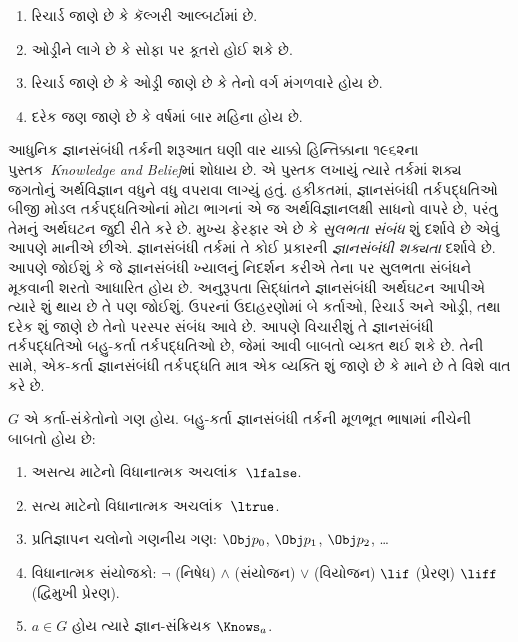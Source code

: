 \begin{enumerate}
\item રિચાર્ડ જાણે છે કે કૅલ્ગરી આલ્બર્ટામાં છે.
\item ઓડ્રીને લાગે છે કે સોફા પર કૂતરો હોઈ શકે છે.
\item રિચાર્ડ જાણે છે કે ઓડ્રી જાણે છે કે તેનો વર્ગ મંગળવારે હોય છે.
\item દરેક જણ જાણે છે કે વર્ષમાં બાર મહિના હોય છે.
\end{enumerate}
આધુનિક જ્ઞાનસંબંધી તર્કની શરૂઆત ઘણી વાર યાક્કો હિન્તિક્કાના
૧૯૬૨ના પુસ્તક~\emph{Knowledge and Belief}માં શોધાય છે. એ પુસ્તક
લખાયું ત્યારે તર્કમાં શક્ય જગતોનું અર્થવિજ્ઞાન વધુને વધુ વપરાવા
લાગ્યું હતું. હકીકતમાં, જ્ઞાનસંબંધી તર્કપદ્ધતિઓ બીજી મોડલ
તર્કપદ્ધતિઓનાં મોટા ભાગનાં એ જ અર્થવિજ્ઞાનલક્ષી સાધનો વાપરે છે,
પરંતુ તેમનું અર્થઘટન જુદી રીતે કરે છે. મુખ્ય ફેરફાર એ છે કે
\emph{સુલભતા સંબંધ} શું દર્શાવે છે એવું આપણે માનીએ છીએ.
જ્ઞાનસંબંધી તર્કમાં તે કોઈ પ્રકારની \emph{જ્ઞાનસંબંધી શક્યતા}
દર્શાવે છે. આપણે જોઈશું કે જે જ્ઞાનસંબંધી ખ્યાલનું નિદર્શન કરીએ
તેના પર સુલભતા સંબંધને મૂકવાની શરતો આધારિત હોય છે. અનુરૂપતા
સિદ્ધાંતને જ્ઞાનસંબંધી અર્થઘટન આપીએ ત્યારે શું થાય છે તે પણ
જોઈશું. ઉપરનાં ઉદાહરણોમાં બે કર્તાઓ, રિચાર્ડ અને ઓડ્રી, તથા
દરેક શું જાણે છે તેનો પરસ્પર સંબંધ આવે છે. આપણે વિચારીશું તે
જ્ઞાનસંબંધી તર્કપદ્ધતિઓ બહુ-કર્તા તર્કપદ્ધતિઓ છે, જેમાં આવી બાબતો
વ્યક્ત થઈ શકે છે. તેની સામે, એક-કર્તા જ્ઞાનસંબંધી તર્કપદ્ધતિ
માત્ર એક વ્યક્તિ શું જાણે છે કે માને છે તે વિશે વાત કરે છે.
\endgroup

\begingroup
\makeatletter{}\makeatother


\label{guunit:OLP-0484}


\begin{defn}
$G$ એ કર્તા-સંકેતોનો ગણ હોય. બહુ-કર્તા જ્ઞાનસંબંધી તર્કની
મૂળભૂત ભાષામાં નીચેની બાબતો હોય છે:
\begin{enumerate}
  \item અસત્ય માટેનો વિધાનાત્મક અચલાંક~$\lfalse$.
  \item સત્ય માટેનો વિધાનાત્મક અચલાંક~$\ltrue$.
  \item પ્રતિજ્ઞાપન ચલોનો ગણનીય ગણ: $\Obj
    p_0$, $\Obj p_1$, $\Obj p_2$, \dots
  \item વિધાનાત્મક સંયોજકો: \startycommalist
  \ycomma $\lnot$ (નિષેધ)%
  \ycomma $\land$ (સંયોજન)%
  \ycomma $\lor$ (વિયોજન)%
  \ycomma $\lif$ (પ્રેરણ)%
  \ycomma $\liff$ (દ્વિમુખી પ્રેરણ).
  \item $a \in G$ હોય ત્યારે જ્ઞાન-સંક્રિયક $\Knows_a$.
\end{enumerate}
\end{defn}

